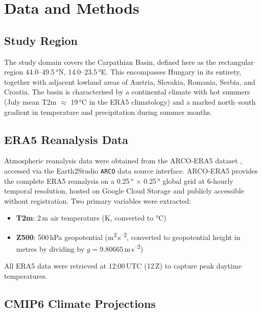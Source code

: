 \documentclass[12pt,a4paper]{article}
\begin{document}
\section{Data and Methods}
\label{sec:methods}

\subsection{Study Region}

The study domain covers the Carpathian Basin, defined here as the
rectangular region 44.0--49.5\,°N, 14.0--23.5\,°E. This encompasses
Hungary in its entirety, together with adjacent lowland areas of Austria,
Slovakia, Romania, Serbia, and Croatia. The basin is characterised by
a continental climate with hot summers (July mean T2m $\approx$ 19\,°C
in the ERA5 climatology) and a marked north--south gradient in temperature
and precipitation during summer months.

\subsection{ERA5 Reanalysis Data}

Atmospheric reanalysis data were obtained from the ARCO-ERA5 dataset
\citep{carver2023arco}, accessed via the Earth2Studio \texttt{ARCO} data
source interface. ARCO-ERA5 provides the complete ERA5 reanalysis on a
0.25\,° × 0.25\,° global grid at 6-hourly temporal resolution, hosted on
Google Cloud Storage and publicly accessible without registration. Two
primary variables were extracted:

\begin{itemize}
  \item \textbf{T2m}: 2\,m air temperature (K, converted to °C)
  \item \textbf{Z500}: 500\,hPa geopotential (m\textsuperscript{2}\,s\textsuperscript{--2},
        converted to geopotential height in metres by dividing by
        $g = 9.80665$\,m\,s\textsuperscript{--2})
\end{itemize}

All ERA5 data were retrieved at 12:00\,UTC (12\,Z) to capture peak
daytime temperatures.

\subsection{CMIP6 Climate Projections}
\end{document}
